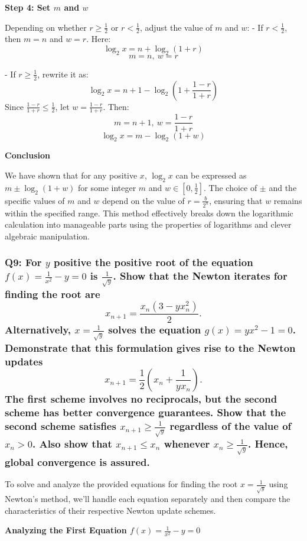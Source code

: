 \documentclass[8pt]{article}
\begin{document}
\textbf{Step 4: Set \(m\) and \(w\)}

Depending on whether \(r \geq \frac{1}{2}\) or \(r < \frac{1}{2}\), adjust the value of \(m\) and \(w\):
- If \(r < \frac{1}{2}\), then \(m = n\) and \(w = r\). Here:
  \[ \log_2 x = n + \log_2 (1 + r) \]
  \[ m = n, \ w = r \]

- If \(r \geq \frac{1}{2}\), rewrite it as:
  \[ \log_2 x = n + 1 - \log_2 \left(1 + \frac{1 - r}{1 + r}\right) \]
  Since \(\frac{1 - r}{1 + r} \leq \frac{1}{2}\), let \(w = \frac{1 - r}{1 + r}\). Then:
  \[ m = n + 1, \ w = \frac{1 - r}{1 + r} \]
  \[ \log_2 x = m - \log_2 (1 + w) \]

\textbf{Conclusion}

We have shown that for any positive \(x\), \(\log_2 x\) can be expressed as \(m \pm \log_2 (1 + w)\) for some integer \(m\) and \(w \in \left[0, \frac{1}{2}\right]\). The choice of \(\pm\) and the specific values of \(m\) and \(w\) depend on the value of \(r = \frac{b}{2^n}\), ensuring that \(w\) remains within the specified range. This method effectively breaks down the logarithmic calculation into manageable parts using the properties of logarithms and clever algebraic manipulation.

\subsubsection*{Q9: For \(y\) positive the positive root of the equation \(f(x) = \frac{1}{x^2} - y = 0\) is \(\frac{1}{\sqrt{y}}\). Show that the Newton iterates for finding the root are
\[ x_{n+1} = \frac{x_n(3 - yx_n^2)}{2}. \]
Alternatively, \(x = \frac{1}{\sqrt{y}}\) solves the equation \(g(x) = yx^2 - 1 = 0\). Demonstrate that this formulation gives rise to the Newton updates
\[ x_{n+1} = \frac{1}{2} \left( x_n + \frac{1}{yx_n} \right). \]
The first scheme involves no reciprocals, but the second scheme has better convergence guarantees. Show that the second scheme satisfies \(x_{n+1} \geq \frac{1}{\sqrt{y}}\) regardless of the value of \(x_n > 0\). Also show that \(x_{n+1} \leq x_n\) whenever \(x_n \geq \frac{1}{\sqrt{y}}\). Hence, global convergence is assured.}

To solve and analyze the provided equations for finding the root \(x = \frac{1}{\sqrt{y}}\) using Newton's method, we'll handle each equation separately and then compare the characteristics of their respective Newton update schemes.

\textbf{
Analyzing the First Equation \(f(x) = \frac{1}{x^2} - y = 0\)}
\end{document}
